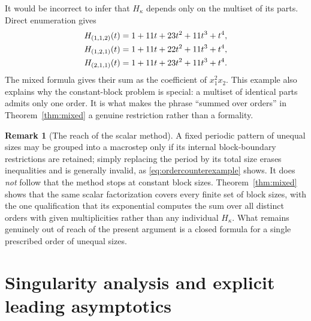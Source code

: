 \documentclass[11pt]{article}
\numberwithin{equation}{section}
\theoremstyle{definition}
\newtheorem{remark}[theorem]{Remark}
\begin{document}
It would be incorrect to infer that $H_\kappa$ depends only on the multiset of
its parts. Direct enumeration gives
\begin{align}
 H_{(1,1,2)}(t)&=1+11t+23t^2+11t^3+t^4,\notag\\
 H_{(1,2,1)}(t)&=1+11t+22t^2+11t^3+t^4,\label{eq:ordercounterexample}\\
 H_{(2,1,1)}(t)&=1+11t+23t^2+11t^3+t^4.\notag
\end{align}
The mixed formula gives their sum as the coefficient of $x_1^2x_2$. This
example also explains why the constant-block problem is special: a multiset of
identical parts admits only one order. It is what makes the phrase ``summed
over orders'' in Theorem~\ref{thm:mixed} a genuine restriction rather than a
formality.

\begin{remark}[The reach of the scalar method]
\label{rem:reach}
A fixed periodic pattern of unequal sizes may be grouped into a macrostep only
if its internal block-boundary restrictions are retained; simply replacing the
period by its total size erases inequalities and is generally invalid, as
\eqref{eq:ordercounterexample} shows. It does \emph{not} follow that the
method stops at constant block sizes. Theorem~\ref{thm:mixed} shows that the
same scalar factorization covers every finite set of block sizes, with the
one qualification that its exponential computes the sum over all distinct
orders with given multiplicities rather than any individual $H_\kappa$. What
remains genuinely out of reach of the present argument is a closed formula for
a single prescribed order of unequal sizes.
\end{remark}

\section{Singularity analysis and explicit leading asymptotics}
\label{sec:asymptotics}
\end{document}
